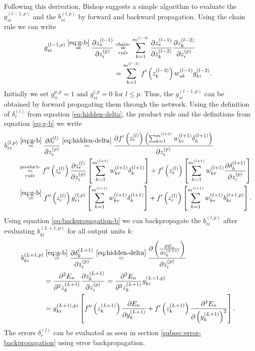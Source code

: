 Following this derivation, Bishop suggests a simple algorithm to evaluate the $g_{si}^{(l-1,p)}$ and the $b_{ri}^{(l,p)}$ by forward and backward propagation. Using the chain rule we can write
\begin{align}
g_{si} ^{(l - 1,p)} \overset{\eqref{eq:g-b}}{=} \frac{\partial z_s^{(l - 1)}}{\partial z_i^{(p)}} & \underset{rule}{\overset{\text{chain-}}{=}} \sum _{k = 1} ^{m^{(l - 2)}} \frac{\partial z_s^{(l-1)}}{\partial z_k^{(l - 2)}} \frac{\partial z_k^{(l - 2)}}{\partial z_i^{(p)}}\notag\\
& = \sum _{k = 1} ^{m^{(l - 2)}} f'\left(z_k^{(l - 2)}\right) w_{sk}^{(l - 1)} g_{ki}^{(l-2)}\onedot
\end{align}
Initially we set $g_{ii}^{p,p} = 1$ and $g_{si}^{l,p} = 0$ for $l \leq p$. Thus, the $g_{si}^{(l-1,p)}$ can be obtained by forward propagating them through the network. Using the definition of $\delta_r^{(l)}$ from equation \eqref{eq:hidden-delta}, the product rule and the definitions from equation \eqref{eq:g-b} we write
\begin{align}
\label{eq:backpropagation-b}
b_{ri} ^{(l,p)} & \overset{\eqref{eq:g-b}}{=} \frac{\partial \delta_r ^{(l)}}{\partial z_i^{(p)}} \overset{\eqref{eq:hidden-delta}}{=} \frac{\partial f'\left(z_r^{(l)}\right) \left(\sum _{k = 1}^{m^{(l+1)}} w_{kr}^{(l+1)} \delta_k^{(l+1)}\right)}{\partial z_i^{(p)}}\notag\\
& \underset{rule}{\overset{\text{product-}}{=}} f''\left(z_r^{(l)}\right) \frac{\partial z_r^{(l)}}{\partial z_i^{(p)}} \left[ \sum _{k = 1}^{m^{(l+1)}} w_{kr}^{(l+1)} \delta _k^{(l+1)}\right] + f'\left(z_r^{(l)}\right) \left[\sum _{k = 1} ^{m^{(l+1)}} w_{kr}^{(l+1)} \frac{\partial \delta_k^{(l+1)}}{\partial z_i^{(p)}}\right]\notag\\
& \overset{\eqref{eq:g-b}}{=} f''\left(z_r^{(l)}\right) g_{ri}^{(l,p)} \left[ \sum _{k = 1}^{m^{(l+1)}} w_{kr}^{(l+1)} \delta _k^{(l+1)}\right] + f'\left(z_r^{(l)}\right) \left[\sum _{k = 1} ^{m^{(l+1)}} w_{kr}^{(l+1)} b_{ki}^{(l+1,p)}\right]\onedot
\end{align}
Using equation \eqref{eq:backpropagation-b} we can backpropagate the $b_{ri}^{(l,p)}$ after evaluating $b_{ki}^{(L+1,p)}$ for all output units $k$:
\begin{align}
b_{ki}^{(L+1,p)} & \overset{\eqref{eq:g-b}}{=} \frac{\partial \delta_k^{(L+1)}}{\partial z_i^{(p)}} \overset{\eqref{eq:hidden-delta}}{=} \frac{\partial \left(\frac{\partial E_n}{\partial z_k^{(L+1)}}\right)}{\partial z_i^{(p)}}\notag\\
& = \frac{\partial^2 E_n}{\partial^2 z_k^{(L+1)}} \frac{\partial z_k^{(L+1)}}{\partial z_i^{(p)}} = \frac{\partial^2 E_n}{\partial^2 z_k^{(L+1)}} g_{ki} ^{(L+1,p)}\notag\\
& = g_{ki}^{(L+1),p)} \left[f''\left(z_k^{(L+1)}\right) \frac{\partial E_n}{\partial y_k^{(L+1)}} + f'\left(z_k^{(L+1)}\right) \frac{\partial ^2 E_n}{\partial \left(y_k^{(L+1)}\right)^2}\right]\onedot
\end{align}
The errors $\delta_r^{(l)}$ can be evaluated as seen in section \ref{subsec:error-backpropagation} using error backpropagation.


